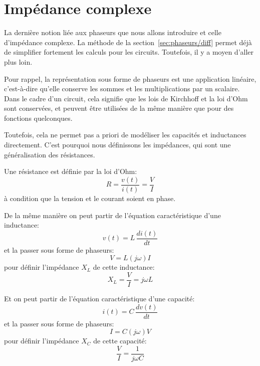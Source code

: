 \section{Impédance complexe}
\label{sec:phaseurs/impedance}

La dernière notion liée aux phaseurs que nous allons introduire
et celle d'impédance complexe.
La méthode de la section~\ref{sec:phaseurs/diff} permet déjà
de simplifier fortement les calculs pour les circuits.
Toutefois, il y a moyen d'aller plus loin.

Pour rappel, la représentation sous forme de phaseurs est une application
linéaire,
c'est-à-dire qu'elle conserve les sommes et les multiplications par un scalaire.
Dans le cadre d'un circuit, cela signifie
que les lois de Kirchhoff et la loi d'Ohm sont conservées,
et peuvent être utilisées de la même manière que pour des fonctions
quelconques.

Toutefois, cela ne permet pas a priori de modéliser les capacités
et inductances directement.
C'est pourquoi nous définissons les impédances, qui sont une généralisation
des résistances.

Une résistance est définie par la loi d'Ohm:
\begin{equation}
    R = \frac{v(t)}{i(t)} = \frac{V}{I}
\end{equation}
à condition que la tension et le courant soient en phase.

De la même manière on peut partir de l'équation caractéristique
d'une inductance:
\begin{equation}
    v(t) = L\,\frac{di(t)}{dt}
\end{equation}
et la passer sous forme de phaseurs:
\begin{equation}
    V = L (j\omega) I
\end{equation}
pour définir l'impédance $X_L$ de cette inductance:
\begin{equation}
    X_L = \frac{V}{I} = j\omega L
\end{equation}

Et on peut partir de l'équation caractéristique d'une capacité:
\begin{equation}
    i(t) = C\,\frac{dv(t)}{dt}
\end{equation}
et la passer sous forme de phaseurs:
\begin{equation}
    I = C (j\omega) V
\end{equation}
pour définir l'impédance $X_C$ de cette capacité:
\begin{equation}
    \frac{V}{I} = \frac{1}{j\omega C}
\end{equation}

